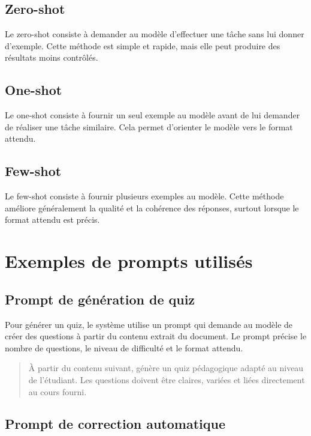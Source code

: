 \documentclass[12pt,a4paper]{report}
\begin{document}
\subsection{Zero-shot}

Le zero-shot consiste à demander au modèle d'effectuer une tâche sans lui donner
d'exemple. Cette méthode est simple et rapide, mais elle peut produire des
résultats moins contrôlés.

\subsection{One-shot}

Le one-shot consiste à fournir un seul exemple au modèle avant de lui demander
de réaliser une tâche similaire. Cela permet d'orienter le modèle vers le format
attendu.

\subsection{Few-shot}

Le few-shot consiste à fournir plusieurs exemples au modèle. Cette méthode
améliore généralement la qualité et la cohérence des réponses, surtout lorsque
le format attendu est précis.

\section{Exemples de prompts utilisés}

\subsection{Prompt de génération de quiz}

Pour générer un quiz, le système utilise un prompt qui demande au modèle de créer
des questions à partir du contenu extrait du document. Le prompt précise le
nombre de questions, le niveau de difficulté et le format attendu.

\begin{quote}
À partir du contenu suivant, génère un quiz pédagogique adapté au niveau de
l'étudiant. Les questions doivent être claires, variées et liées directement au
cours fourni.
\end{quote}

\subsection{Prompt de correction automatique}
\end{document}
